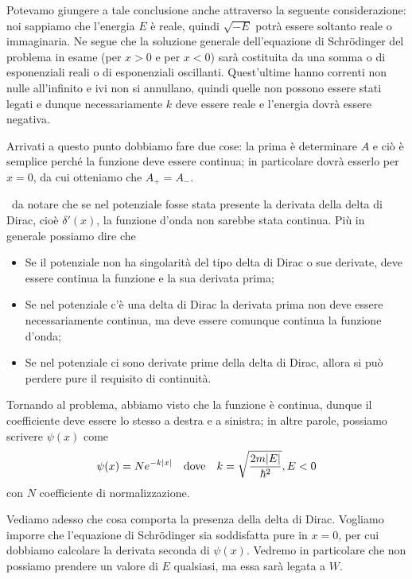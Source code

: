 \begin{soluzione}
   Potevamo giungere a tale conclusione anche attraverso la seguente considerazione: noi sappiamo che l'energia $E$ è reale, quindi $\sqrt{-E}$ potrà essere soltanto reale o immaginaria. Ne segue che la soluzione generale dell'equazione di Schrödinger del problema in esame (per $x>0$ e per $x<0$) sarà costituita da una somma o di esponenziali reali o di esponenziali oscillanti. Quest'ultime hanno correnti non nulle all'infinito e ivi non si annullano, quindi quelle non possono essere stati legati e dunque necessariamente $k$ deve essere reale e l'energia dovrà essere negativa.
   
   Arrivati a questo punto dobbiamo fare due cose: la prima è determinare $A$ e ciò è semplice perché la funzione deve essere continua; in particolare dovrà esserlo per $x=0$, da cui otteniamo che $A_{+}=A_{-}$.
   
   \E\ da notare che se nel potenziale fosse stata presente la derivata della delta di Dirac, cioè $\delta'(x)$, la funzione d'onda non sarebbe stata continua. Più in generale possiamo dire che
   \begin{itemize}
      \item Se il potenziale non ha singolarità del tipo delta di Dirac o sue derivate, deve essere continua la funzione e la sua derivata prima;
      \item Se nel potenziale c'è una delta di Dirac la derivata prima non deve essere necessariamente continua, ma deve essere comunque continua la funzione d'onda;
      \item Se nel potenziale ci sono derivate prime della delta di Dirac, allora si può perdere pure il requisito di continuità.
   \end{itemize}
   Tornando al problema, abbiamo visto che la funzione è continua, dunque il coefficiente deve essere lo stesso a destra e a sinistra; in altre parole, possiamo scrivere $\psi(x)$ come
   \begin{equation*}
      \psi(x)=Ne^{-k|x|}
      \qqtext{dove}
      k=\sqrt{\frac{2m|E|}{\hbar^2}}, E<0
   \end{equation*}
   con $N$ coefficiente di normalizzazione.
   
   Vediamo adesso che cosa comporta la presenza della delta di Dirac. Vogliamo imporre che l'equazione di Schrödinger sia soddisfatta pure in $x=0$, per cui dobbiamo calcolare la derivata seconda di $\psi(x)$. Vedremo in particolare che non possiamo prendere un valore di $E$ qualsiasi, ma essa sarà legata a $W$.
   

\end{soluzione}

